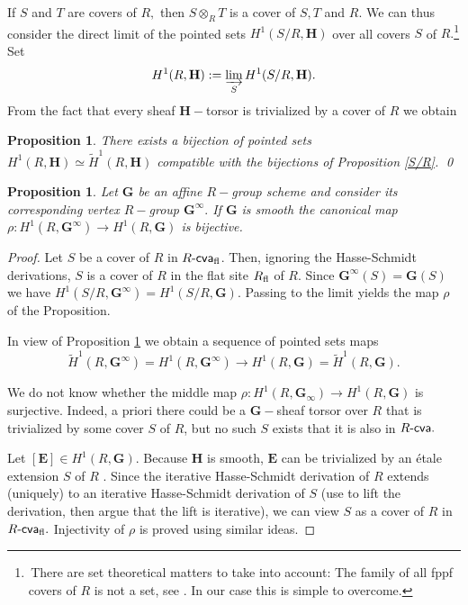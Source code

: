 \documentclass{article}
\newtheorem{prop}[thm]{Proposition}
\theoremstyle{definition}
\def\Rcva{\ensuremath{R\text{-\textup{\textsf{cva}}}}}
\def\BG{\ensuremath{\mathbf{G}}}
\def\BH{\ensuremath{\mathbf{H}}}
\def\tH{\ensuremath{\widetilde {H}}}
\begin{document}
If $S$ and $T$ are covers of $R,$ then $S \otimes_R T$ is a  cover of $S,T$ and $R.$ We can thus consider the direct limit of the pointed sets $H^1(S/R, \BH)$ over all covers $S$ of $R.$\footnote{\,There are set theoretical matters to take into account: The family of all fppf covers of $R$ is not a set, see \cite[Tag 00VI]{SP}. In our case this is simple to overcome.}  Set
\begin{equation}\label{tor2}
 H^1(R, \BH) := \varinjlim_S H^1(S/R, \BH) .
\end{equation}
From the fact that every sheaf $\BH-$torsor is trivialized by a  cover of $R$ we obtain
\begin{prop}\label{limitdescent}
There exists a bijection of pointed sets $H^1(R, \BH) \simeq \tH^1(R,\BH)$ compatible with the bijections of Proposition \ref{S/R}. \qed
\end{prop}

\begin{prop}\label{tor3} Let $\BG$ be an affine $R-$group scheme and consider its corresponding vertex $R-$group $\BG^\infty.$ If $\BG$ is smooth the canonical map $\rho : H^1(R, \BG^\infty) \to H^1(R, \BG)$ is bijective.
       \end{prop}
\begin{proof} Let $S$ be a cover of $R$ in $\Rcva_{\rm fl}$. Then, ignoring the Hasse-Schmidt derivations, $S$ is a cover of $R$ in the flat site $R_{\rm fl}$ of $R.$ Since  $\BG^\infty(S) = \BG(S)$ we have $H^1(S/R, \BG^\infty) = H^1(S/R, \BG).$ Passing to the limit yields the map $\rho$ of the Proposition.  

 In view of Proposition \ref{limitdescent} we obtain a sequence of pointed sets maps
$$\tH^1(R, \BG^\infty) = H^1(R, \BG^\infty) \to H^1(R, \BG) = \tH^1(R, \BG).$$

We do not know whether the middle map $\rho \colon H^1(R, \BG_\infty) \to H^1(R, \BG)$ is surjective. Indeed, a priori there could be a $\BG-$sheaf torsor over $R$ that is trivialized by some  cover $S$ of $R$, but no such $S$ exists that it is also in $\Rcva.$  

Let $[\mathbf{E}] \in H^1(R, \BG).$ Because $\BH$ is smooth, $\mathbf{E}$ can be trivialized by an \'etale extension $S$ of $R$ \cite[\@III \S4 Prop.\ 4.1 infra]{Mln}. Since the iterative Hasse-Schmidt derivation of $R$  extends (uniquely) to an iterative Hasse-Schmidt derivation of $S$ (use \cite[Theo.\@ 3.6]{Voj} to lift the derivation, then argue that the lift is iterative),  we can  view $S$ as a cover of $R$ in $\Rcva_{\rm fl}.$  Injectivity of $\rho$ is proved using similar ideas. \end{proof}
\end{document}
